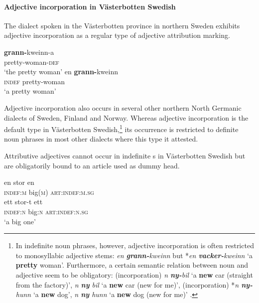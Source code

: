 \paragraph*{Adjective incorporation in Västerbotten Swedish}
\label{bondska synchr}
The dialect spoken in the Västerbotten province in northern Sweden exhibits adjective incorporation as a regular type of adjective attribution marking.
\begin{exe}
\begin{xlist}
\ex
\gll 	\textbf{grann-}kweinn-a\\	
	pretty-woman-\textsc{def}\\
\glt	‘the pretty woman’
\ex
\gll	en \textbf{grann-}kweinn\\
	\textsc{indef} pretty-woman\\
\glt	‘a pretty woman’
\end{xlist}
\end{exe}
Adjective incorporation also occurs in several other northern North Germanic dialects of Sweden, Finland and Norway. Whereas adjective incorporation is the default type in Västerbotten Swedish,\footnote{In indefinite noun phrases, however, adjective incorporation is often restricted to monosyllabic adjective stems: \textit{en \textbf{grann-}kweinn} but *\textit{en \textbf{vacker-}kweinn} ‘a \textbf{pretty} woman’. Furthermore, a certain semantic relation between noun and adjective seem to be obligatory: (incorporation) \textit{n \textbf{ny-}bil} ‘a \textbf{new} car (straight from the factory)’, \textit{n \textbf{ny} bil} ‘a \textbf{new} car (new for me)’, (incorporation) *\textit{n \textbf{ny-}hunn} ‘a \textbf{new} dog’, \textit{n \textbf{ny} hunn} ‘a \textbf{new} dog (new for me)’ \citep[91–92]{holmberg-etal2003}.} its occurrence is restricted to definite noun phrases in most other dialects where this type it attested.

Attributive adjectives cannot occur in indefinite s in Västerbotten Swedish but are obligatorily bound to an article used as dummy head.
\begin{exe}
\begin{xlist}
\ex
\gll 	en stor en\\	
	\textsc{indef:m} big(\textsc{m}) \textsc{art:indef:m.sg}\\
\ex
\gll 	ett stor-t ett\\	
	\textsc{indef:n} big:\textsc{n} \textsc{art:indef:n.sg}\\
\glt	‘a big one’
\end{xlist}
\end{exe}

